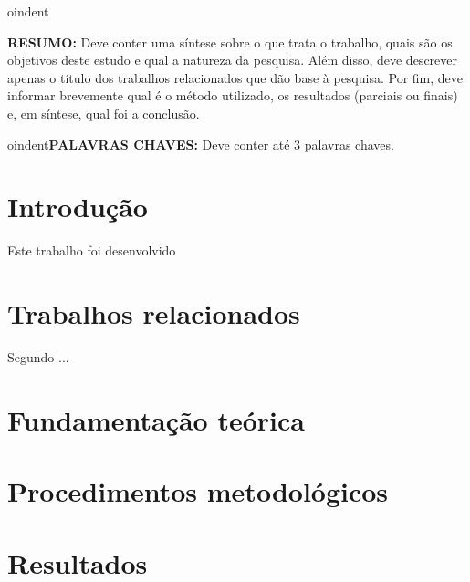 \documentclass[12pt]{article}
\begin{document}
oindent{\textbf{RESUMO:} Deve conter uma síntese sobre o que trata o trabalho, quais são os objetivos deste estudo e qual a natureza da pesquisa. Além disso, deve descrever apenas o título dos trabalhos relacionados que dão base à pesquisa. Por fim, deve informar brevemente qual é o método utilizado, os resultados (parciais ou finais) e, em síntese, qual foi a conclusão.

\vspace*{0.5cm}


oindent{\textbf{PALAVRAS CHAVES:} Deve conter até 3 palavras chaves.} 



\section{Introdução}


Este trabalho foi desenvolvido


\section{Trabalhos relacionados} \label{sec:firstpage}

Segundo \cite{1} ...


\section{Fundamentação teórica}

\lipsum[2] %


\section{Procedimentos metodológicos}

\lipsum[2] %


\section{Resultados}\label{sec:analisedosdados}

\lipsum[2] %


}
\end{document}
